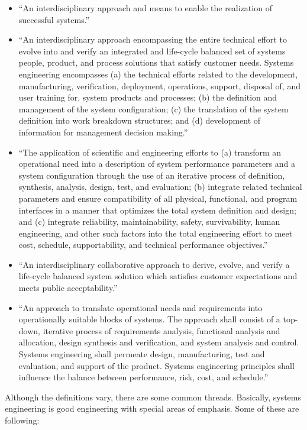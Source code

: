 \begin{itemize}
\item “An interdisciplinary approach and means to enable the realization of successful systems.”
\item “An interdisciplinary approach encompassing the entire technical effort to evolve into and verify an integrated and life-cycle balanced set of systems people, product, and process solutions that satisfy customer needs. Systems engineering encompasses (a) the technical efforts related to the development, manufacturing, verification, deployment, operations, support, disposal of, and user training for, system products and processes; (b) the definition and management of the system configuration; (c) the translation of the system definition into work breakdown structures; and (d) development of information for management decision making.”
\item “The application of scientific and engineering efforts to (a) transform an operational need into a description of system performance parameters and a system configuration through the use of an iterative process of definition, synthesis, analysis, design, test, and evaluation; (b) integrate related technical parameters and ensure compatibility of all physical, functional, and program interfaces in a manner that optimizes the total system definition and design; and (c) integrate reliability, maintainability, safety, survivability, human engineering, and other such factors into the total engineering effort to meet cost, schedule, supportability, and technical performance objectives.”
\item “An interdisciplinary collaborative approach to derive, evolve, and verify a life-cycle balanced system solution which satisfies customer expectations and meets public acceptability.”
\item “An approach to translate operational needs and requirements into operationally suitable blocks of systems. The approach shall consist of a top-down, iterative process of requirements analysis, functional analysis and allocation, design synthesis and verification, and system analysis and control. Systems engineering shall permeate design, manufacturing, test and evaluation, and support of the product. Systems engineering principles shall influence the balance between performance, risk, cost, and schedule.”
\end{itemize}

Although the definitions vary, there are some common threads. Basically, systems engineering is good engineering with special areas of emphasis. Some of these are following:

